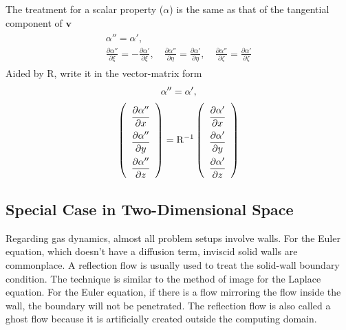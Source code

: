 \documentclass[a4paper,12pt,dvips]{article}
\begin{document}
The treatment for a scalar property ($\alpha$) is the same as that of the
tangential component of $\mathbf{v}$
\begin{align*}
\begin{gathered}
  \alpha'' = \alpha', \\
  \frac{\partial \alpha''}{\partial\xi} =
  -\frac{\partial \alpha'}{\partial\xi}, \quad
  \frac{\partial \alpha''}{\partial\eta} =
  \frac{\partial \alpha'}{\partial\eta}, \quad
  \frac{\partial \alpha''}{\partial\zeta} =
  \frac{\partial \alpha'}{\partial\zeta}
\end{gathered}
\end{align*}
Aided by $\mathrm{R}$, write it in the vector-matrix form
\begin{align*}
\begin{gathered}
  \alpha'' = \alpha', \\
  \renewcommand{\arraystretch}{2.2}
  \left(\begin{array}{c}
    \dfrac{\partial\alpha''}{\partial x} \\
    \dfrac{\partial\alpha''}{\partial y} \\
    \dfrac{\partial\alpha''}{\partial z} \\
  \end{array}\right)
  = \mathrm{R}^{-1}
  \left(\begin{array}{c}
    \dfrac{\partial\alpha'}{\partial x} \\
    \dfrac{\partial\alpha'}{\partial y} \\
    \dfrac{\partial\alpha'}{\partial z} \\
  \end{array}\right)
\end{gathered}
\end{align*}

\subsection{Special Case in Two-Dimensional Space}

Regarding gas dynamics, almost all problem setups involve walls.  For the Euler
equation, which doesn't have a diffusion term, inviscid solid walls are
commonplace.  A reflection flow is usually used to treat the solid-wall
boundary condition\cite{laney_computational_1998}.  The technique is similar to
the method of image for the Laplace equation.  For the Euler equation, if there
is a flow mirroring the flow inside the wall, the boundary will not be
penetrated.  The reflection flow is also called a ghost flow because it is
artificially created outside the computing domain.
\end{document}
